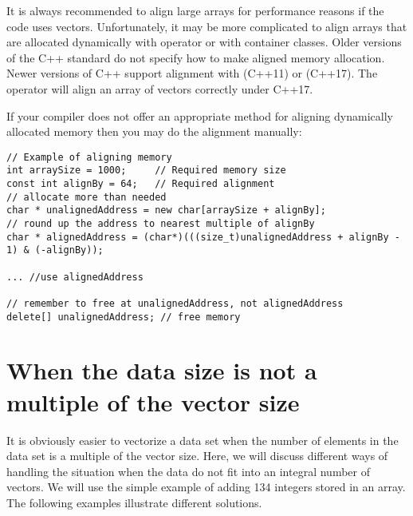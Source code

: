 \documentclass[vcl_manual.tex]{subfiles}
\begin{document}
It is always recommended to align large arrays for performance reasons if the code uses vectors. Unfortunately, it may be more complicated to align arrays that are allocated dynamically with operator  or with container classes. 
Older versions of the C++ standard do not specify how to make aligned memory allocation. Newer versions of C++ support alignment with  (C++11) or  (C++17). 
The operator  will align an array of vectors correctly under C++17.

If your compiler does not offer an appropriate method for aligning dynamically allocated memory then you may do the alignment manually:

\begin{lstlisting}[frame=none]
// Example of aligning memory
int arraySize = 1000;     // Required memory size
const int alignBy = 64;   // Required alignment
// allocate more than needed
char * unalignedAddress = new char[arraySize + alignBy];
// round up the address to nearest multiple of alignBy
char * alignedAddress = (char*)(((size_t)unalignedAddress + alignBy - 1) & (-alignBy));

... //use alignedAddress

// remember to free at unalignedAddress, not alignedAddress
delete[] unalignedAddress; // free memory

\end{lstlisting}



\section{When the data size is not a multiple of the vector size}\label{NotAMultipleOfVectorSize}

It is obviously easier to vectorize a data set when the number of elements in the data set is a multiple of the vector size. Here, we will discuss different ways of handling the situation when the data do not fit into an integral number of vectors. We will use the simple example of adding 134 integers stored in an array. The following examples illustrate different solutions.
\end{document}
